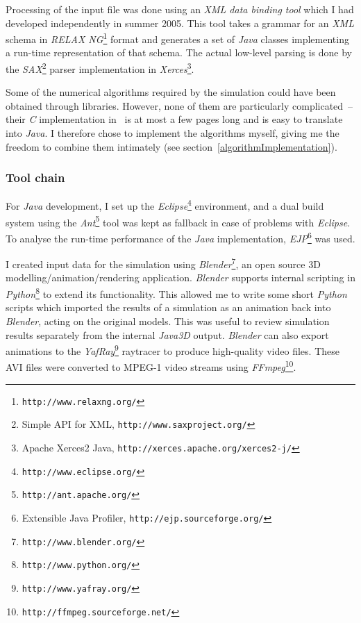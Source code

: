 Processing of the input file was done using an \textsl{XML data binding tool} which I had
developed independently in summer 2005. This tool takes a grammar for an \textsl{XML} schema in
\textsl{RELAX NG}\footnote{\texttt{http://www.relaxng.org/}} format and generates a set of
\textsl{Java} classes implementing a run-time representation of that schema. The actual low-level parsing
is done by the \textsl{SAX}\footnote{Simple API for XML, \texttt{http://www.saxproject.org/}}
parser implementation in \textsl{Xerces}\footnote{Apache Xerces2 Java,
\texttt{http://xerces.apache.org/xerces2-j/}}.

Some of the numerical algorithms required by the simulation could have been obtained through
libraries. However, none of them are particularly complicated~-- their \textsl{C} implementation
in~\cite{NRinC} is at most a few pages long and is easy to translate into \textsl{Java}. I
therefore chose to implement the algorithms myself, giving me the freedom to combine them
intimately (see section~\ref{algorithmImplementation}).

\subsubsection{Tool chain}
For \textsl{Java} development, I set up the \textsl{Eclipse}\footnote{\texttt{http://www.eclipse.org/}}
environment, and a dual build system using the \textsl{Ant}\footnote{\texttt{http://ant.apache.org/}}
tool was kept as fallback in case of problems with \textsl{Eclipse}. To analyse the run-time
performance of the \textsl{Java} implementation,
\textsl{EJP}\footnote{Extensible Java Profiler, \texttt{http://ejp.sourceforge.org/}} was used.

I created input data for the simulation using \textsl{Blender}\footnote{\texttt{http://www.blender.org/}},
an open source 3D modelling/animation/rendering application. \textsl{Blender} supports internal
scripting in \textsl{Python}\footnote{\texttt{http://www.python.org/}} to extend its functionality.
This allowed me to write some short \textsl{Python} scripts which imported the results of a
simulation as an animation back into \textsl{Blender}, acting on the original models. This was useful
to review simulation results separately from the internal \textsl{Java3D} output. \textsl{Blender}
can also export animations to the \textsl{YafRay}\footnote{\texttt{http://www.yafray.org/}}
raytracer to produce high-quality video files. These AVI files were converted to MPEG-1 video
streams using \textsl{FFmpeg}\footnote{\texttt{http://ffmpeg.sourceforge.net/}}.

